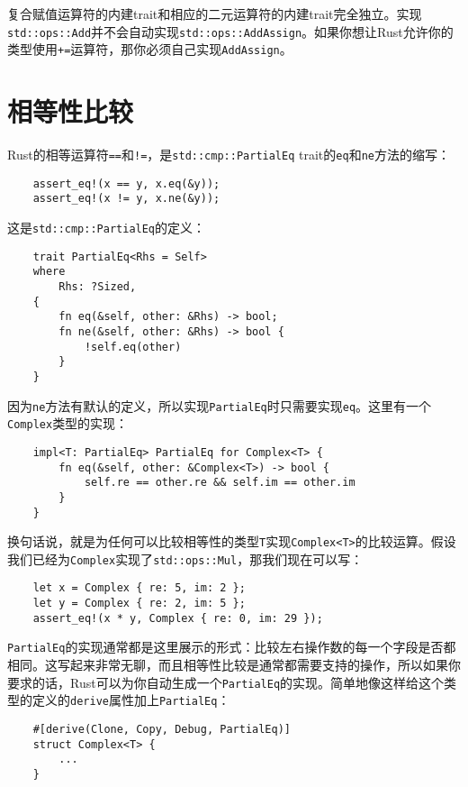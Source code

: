 复合赋值运算符的内建trait和相应的二元运算符的内建trait完全独立。实现\texttt{std::ops::Add}并不会自动实现\texttt{std::ops::AddAssign}。如果你想让Rust允许你的类型使用\texttt{+=}运算符，那你必须自己实现\texttt{AddAssign}。

\section{相等性比较}\label{equal}

Rust的相等运算符\texttt{==}和\texttt{!=}，是\texttt{std::cmp::PartialEq} trait的\texttt{eq}和\texttt{ne}方法的缩写：
\begin{verbatim}
    assert_eq!(x == y, x.eq(&y));
    assert_eq!(x != y, x.ne(&y));
\end{verbatim}

这是\texttt{std::cmp::PartialEq}的定义：
\begin{verbatim}
    trait PartialEq<Rhs = Self>
    where
        Rhs: ?Sized,
    {
        fn eq(&self, other: &Rhs) -> bool;
        fn ne(&self, other: &Rhs) -> bool {
            !self.eq(other)
        }
    }
\end{verbatim}

因为\texttt{ne}方法有默认的定义，所以实现\texttt{PartialEq}时只需要实现\texttt{eq}。这里有一个\texttt{Complex}类型的实现：
\begin{verbatim}
    impl<T: PartialEq> PartialEq for Complex<T> {
        fn eq(&self, other: &Complex<T>) -> bool {
            self.re == other.re && self.im == other.im
        }
    }
\end{verbatim}

换句话说，就是为任何可以比较相等性的类型\texttt{T}实现\texttt{Complex<T>}的比较运算。假设我们已经为\texttt{Complex}实现了\texttt{std::ops::Mul}，那我们现在可以写：
\begin{verbatim}
    let x = Complex { re: 5, im: 2 };
    let y = Complex { re: 2, im: 5 };
    assert_eq!(x * y, Complex { re: 0, im: 29 });
\end{verbatim}

\texttt{PartialEq}的实现通常都是这里展示的形式：比较左右操作数的每一个字段是否都相同。这写起来非常无聊，而且相等性比较是通常都需要支持的操作，所以如果你要求的话，Rust可以为你自动生成一个\texttt{PartialEq}的实现。简单地像这样给这个类型的定义的\texttt{derive}属性加上\texttt{PartialEq}：
\begin{verbatim}
    #[derive(Clone, Copy, Debug, PartialEq)]
    struct Complex<T> {
        ...
    }
\end{verbatim}

